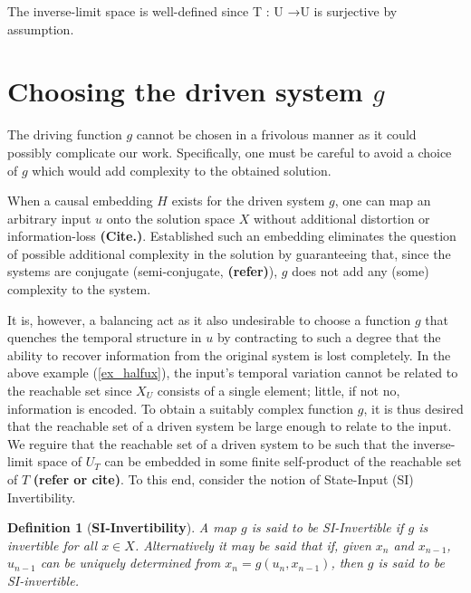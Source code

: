 \documentclass[a4paper,12pt,twoside]{report}
\newtheorem{Definition}{Definition}[]
\begin{document}
The inverse-limit space is well-defined since T : U →U is surjective by assumption.


\section{Choosing the driven system $g$}

The driving function $g$ cannot be chosen in a frivolous manner as it could possibly complicate our work. Specifically, one must be careful to avoid a choice of $g$ which would  add complexity to the obtained solution.  

When a causal embedding $H$ exists for the driven system $g$, one can map an arbitrary input ${u}$ onto the solution space $X$ without additional distortion or information-loss \textbf{(Cite.)}.
Established such an embedding eliminates the question of possible additional complexity in the solution by guaranteeing that, since the systems are conjugate (semi-conjugate, \textbf{(refer)}), $g$ does not add any (some) complexity to the system.  

It is, however, a balancing act as it also undesirable to choose a function $g$ that quenches the temporal structure in $u$ by contracting to such a degree that the ability to recover information from the original system is lost completely.
In the above example (\ref{ex_halfux}), the input's temporal variation cannot be related to the reachable set since $X_U$ consists of a single element; little, if not no, information is encoded.
To obtain a suitably complex function $g$, it is thus desired that the reachable set of a driven system  be large enough to relate to the input. 
 We  reguire that the reachable set of a driven system to be such that the inverse-limit space of $U_T$ can be embedded in some finite self-product of the reachable set of $T$ \textbf{(refer or cite)}. To this end, consider the notion of State-Input (SI) Invertibility.  

\begin{Definition}
  [\bf SI-Invertibility]\label{Dfn_SIinv}\rm
  A map $g$ is said to be SI-Invertible if $g$ is invertible for all $x\in{X}$. Alternatively it may be said that if, given $x_n$ and $x_{n-1}$, $u_{n-1}$ can be uniquely determined from $x_n=g(u_n,x_{n-1})$, then $g$ is said to be SI-invertible.
\end{Definition}
 
\end{document}
